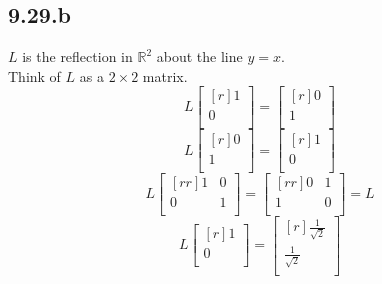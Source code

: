 \documentclass{report}
\begin{document}
\subsection{9.29.b}
$L$ is the reflection in $\mathbb{R}^2$ about the line $y=x$.\\
Think of $L$ as a $2\times 2$ matrix.
\[ L\begin{bmatrix}[r]1\\0\\\end{bmatrix} = \begin{bmatrix}[r]0\\1\\\end{bmatrix} \]
\[ L\begin{bmatrix}[r]0\\1\\\end{bmatrix} = \begin{bmatrix}[r]1\\0\\\end{bmatrix} \]
\[ L\begin{bmatrix}[rr]1&0\\0&1\\\end{bmatrix} = \begin{bmatrix}[rr]0&1\\1&0\\\end{bmatrix} = L \]
\[ L\begin{bmatrix}[r]1\\0\\\end{bmatrix} = \begin{bmatrix}[r]\frac{1}{\sqrt{2}}\\\frac{1}{\sqrt{2}}\\\end{bmatrix} \]
\end{document}
